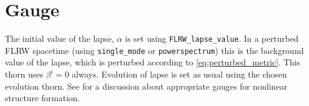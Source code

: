 %
%
%
%
%


\section{Gauge}
\label{sec:gauge}

The initial value of the lapse, $\alpha$ is set using \texttt{FLRW\_lapse\_value}. In a perturbed FLRW spacetime (using {\tt single\_mode} or {\tt powerspectrum}) this is the background value of the lapse, which is perturbed according to \eqref{eq:perturbed_metric}. This thorn uses $\beta^i=0$ always. Evolution of lapse is set as usual using the chosen evolution thorn. See \cite{macpherson2019} for a discussion about appropriate gauges for nonlinear structure formation. 




